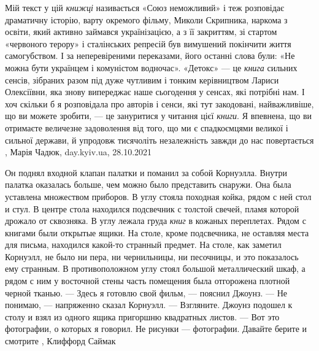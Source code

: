 Мій текст у цій \emph{книжці} називається «Союз неможливий» і теж розповідає
драматичну історію, варту окремого фільму, Миколи Скрипника, наркома з освіти,
який активно займався українізацією, а з її закриттям, зі стартом «червоного
терору» і сталінських репресій був вимушений покінчити життя самогубством. І за
неперевіреними переказами, його останні слова були: «Не можна бути українцем і
комуністом водночас». «Детокс» — це \emph{книга} сильних сенсів, зібраних
разом під дуже чутливим і тонким керівництвом Лариси Олексіївни, яка знову
випереджає наше сьогодення у сенсах, які потрібні нам. І хоч скільки б я
розповідала про авторів і сенси, які тут закодовані, найважливіше, що ви можете
зробити, — це зануритися у читання цієї \emph{книги}. Я впевнена, що ви
отримаєте величезне задоволення від того, що ми є спадкоємцями великої і
сильної держави, й упродовж тисячоліть незалежність завжди до нас повертається
, 
Марія Чадюк, day.kyiv.ua, 28.10.2021

Он поднял входной клапан палатки и поманил за собой Корнуэлла. Внутри палатка
оказалась больше, чем можно было представить снаружи. Она была уставлена
множеством приборов. В углу стояла походная койка, рядом с ней стол и стул. В
центре стола находился подсвечник с толстой свечей, пламя которой дрожало от
сквозняка. В углу лежала груда \emph{книг} в кожаных переплетах. Рядом с
книгами были открытые ящики. На столе, кроме подсвечника, не оставляя места для
письма, находился какой-то странный предмет. На столе, как заметил Корнуэлл, не
было ни пера, ни чернильницы, ни песочницы, и это показалось ему странным. В
противоположном углу стоял большой металлический шкаф, а рядом с ним у
восточной стены часть помещения была отгорожена плотной черной тканью.  — Здесь
я готовлю свой фильм, — пояснил Джоунз.  — Не понимаю, — напряженно сказал
Корнуэлл.  — Взгляните.  Джоунз подошел к столу и взял из одного ящика
пригоршню квадратных листов.  — Вот это фотографии, о которых я говорил. Не
рисунки — фотографии. Давайте берите и смотрите
, Клиффорд Саймак

